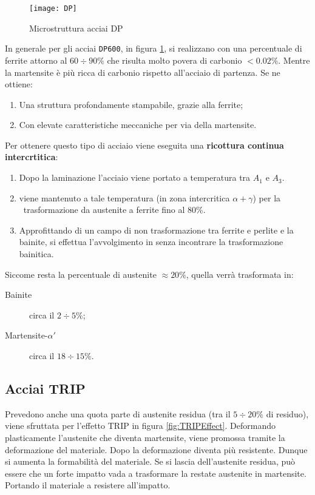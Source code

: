 \begin{figure}
\centering
\texttt{[image: DP]}
\caption{Microstruttura acciai \ac{DP}}
\label{fig:DP}
\end{figure}   

In generale per gli acciai \texttt{DP600}, in figura \ref{fig:DP}, si realizzano con una percentuale di ferrite attorno al
$60\div90\%$ che risulta molto povera di carbonio $<0.02\%$. Mentre la martensite è più ricca di
carbonio rispetto all'acciaio di partenza. Se ne ottiene:
\begin{enumerate}
\item Una struttura profondamente stampabile, grazie alla ferrite;
\item Con elevate caratteristiche meccaniche per via della martensite.
\end{enumerate}

Per ottenere questo tipo di acciaio viene eseguita una \textbf{ricottura continua intercrtitica}:
\begin{enumerate}
\item Dopo la laminazione l'acciaio viene portato a temperatura tra $A_1$ e $A_3$.
\item viene mantenuto a tale temperatura (in zona intercritica $\alpha + \gamma$) per la \
trasformazione da austenite a ferrite fino al 80\%.
\item Approfittando di un campo di non trasformazione tra ferrite e perlite e la bainite, si
effettua l'avvolgimento in \eng{coils} senza incontrare la trasformazione bainitica.
\end{enumerate}
Siccome resta la percentuale di austenite $\approx 20\%$, quella verrà trasformata in:
\begin{description}
\item[Bainite] circa il $2\div 5\%$;
\item[Martensite-$\alpha'$] circa il $18 \div 15\%$.
\end{description} 

\subsection{Acciai TRIP}
Prevedono anche una quota parte di austenite residua (tra il $5\div20\%$ di residuo), viene 
sfruttata per l'effetto \ac{TRIP} in figura \ref{fig:TRIPEffect}.
Deformando plasticamente l'austenite che diventa martensite, viene promossa tramite la deformazione 
del materiale. Dopo la deformazione diventa più resistente.
Dunque si aumenta la formabilità del materiale. Se si lascia dell'austenite residua, può essere che 
un forte impatto vada a trasformare la restate austenite in martensite. Portando il materiale a 
resistere all'impatto.

